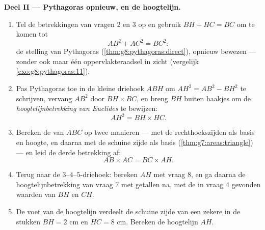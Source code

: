 \begin{problem}[{Weekendopgave --- de hoogtelijn van een rechthoekige driehoek:
$AB^2 = BH \times BC$, $AH^2 = BH \times HC$, een tweede bewijs van Pythagoras,
en een machine om vierkantswortels te construeren}]
\medskip
\noindent\textbf{Deel II --- Pythagoras opnieuw, en de hoogtelijn.}
\begin{enumerate}[resume]
  \item Tel de betrekkingen van vragen 2 en 3 op en gebruik $BH + HC = BC$ om te
        komen tot
        \[
        AB^2 + AC^2 = BC^2 :
        \]
        de stelling van Pythagoras (\cref{thm:g8:pythagoras:direct}), opnieuw
        bewezen --- zonder ook maar één oppervlakteraadsel in zicht (vergelijk
        \cref{exo:g8:pythagoras:11}).
  \item Pas Pythagoras toe in de kleine driehoek $ABH$ om $AH^2 = AB^2 - BH^2$ te
        schrijven, vervang $AB^2$ door $BH \times BC$, en breng $BH$ buiten
        haakjes om de \emph{hoogtelijnbetrekking van Euclides} te bewijzen:
        \[
        AH^2 = BH \times HC .
        \]
  \item Bereken de  van $ABC$ op twee manieren --- met de
        rechthoekszijden als basis en hoogte, en daarna met de schuine zijde als
        basis (\cref{thm:g7:areas:triangle}) --- en leid de derde betrekking af:
        \[
        AB \times AC = BC \times AH .
        \]
  \item Terug naar de $3$--$4$--$5$-driehoek: bereken $AH$ met vraag 8, en ga
        daarna de hoogtelijnbetrekking van vraag 7 met getallen na, met de in
        vraag 4 gevonden waarden van $BH$ en $CH$.
  \item De voet van de hoogtelijn verdeelt de schuine zijde van een zekere
         in de stukken $BH = 2$ cm en $HC = 8$ cm. Bereken
        de hoogtelijn $AH$.
\end{enumerate}


\end{problem}
